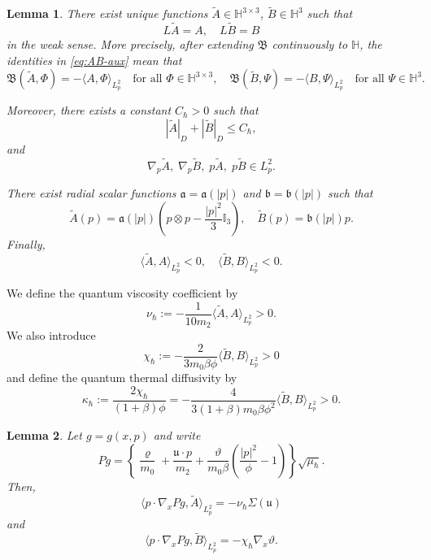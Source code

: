 \documentclass[10pt,a4paper]{amsart}
\newtheorem{lemma}{Lemma}
\newcommand{\bq}{\begin{equation}}
\newcommand{\eq}{\end{equation}}
\newcommand{\lal}{\langle}
\newcommand{\lt}{\left}
\newcommand{\mfu}{\mathfrak{u}}
\newcommand{\ral}{\rangle}
\newcommand{\rt}{\right}
\newcommand{\vrh}{\varrho}
\newcommand{\vth}{\vartheta}
\begin{document}
\begin{lemma}\label{lem:AB-solv}
There exist unique functions $\widetilde A \in \mathbb{H}^{3\times3}$, $\widetilde B \in \mathbb{H}^3$ such that
\bq\label{eq:AB-aux}
L\widetilde A = A, \quad L\widetilde B = B
\eq
in the weak sense. More precisely, after extending $\mathfrak{B}$ continuously to $\mathbb{H}$, the identities in \eqref{eq:AB-aux} mean that
\bq\label{eq:AB-weak}
\mathfrak{B}(\widetilde A,\Phi)=-\lal A,\Phi\ral_{L^2_p}
\quad\text{for all } \Phi\in\mathbb{H}^{3\times3},
\quad
\mathfrak{B}(\widetilde B,\Psi)=-\lal B,\Psi\ral_{L^2_p}
\quad\text{for all } \Psi\in\mathbb{H}^{3}.
\eq

Moreover, there exists a constant $C_\hbar>0$ such that
\bq\label{eq:AB-D}
| \widetilde A |_D + | \widetilde B |_D \le C_\hbar,
\eq
and
\bq \label{eq:AB-L2}
\nabla_p\widetilde A, \; \nabla_p\widetilde B, \; p\widetilde A, \; p\widetilde B \in L^2_p.
\eq

There exist radial scalar functions $\mathfrak a=\mathfrak a(|p|)$ and $\mathfrak b=\mathfrak b(|p|)$
such that
\[
\widetilde A(p) = \mathfrak a(|p|) \lt( p\otimes p - \frac{|p|^2}{3} \mathbb I_3 \rt),\quad \widetilde B(p) = \mathfrak b(|p|) p.
\]
Finally,
\[
\lal \widetilde A, A \ral_{L^2_p} < 0, \quad \lal \widetilde B, B \ral_{L^2_p} < 0.
\]
\end{lemma}

We define the quantum viscosity coefficient by
\bq \label{eq:nu-h}
\nu_\hbar:=-\frac{1}{10m_2 }\lal\widetilde A ,A \ral_{L^2_p}>0.
\eq
We also introduce
\[
\chi_\hbar:=-\frac{2}{3m_0\beta\phi }\lal\widetilde B ,B \ral_{L^2_p}>0
\]
and define the quantum thermal diffusivity by
\[
\kappa_\hbar:=\frac{2\chi_\hbar}{(1+\beta )\phi }=-\frac{4}{3(1+\beta )m_0\beta\phi ^2}\lal\widetilde B ,B \ral_{L^2_p}>0.
\]

\begin{lemma}\label{lem:tr-flux}
Let $g=g(x,p)$ and write
\[
P g=\lt\{\frac{\vrh}{m_0 }+\frac{\mfu\cdot p}{m_2 }+\frac{\vth}{m_0\beta}\lt(\frac{|p|^2}{\phi }-1\rt)\rt\}\sqrt{\mu_\hbar}.
\]
Then,
\bq\label{eq:A-tr-app}
\lal p\cdot\nabla_xP g,\widetilde A \ral_{L^2_p}=-\nu_\hbar\Sigma(\mfu)
\eq
and
\bq\label{eq:B-tr-app}
\lal p\cdot\nabla_xP g,\widetilde B \ral_{L^2_p}=-\chi_\hbar\nabla_x\vth.
\eq
\end{lemma}
\end{document}
